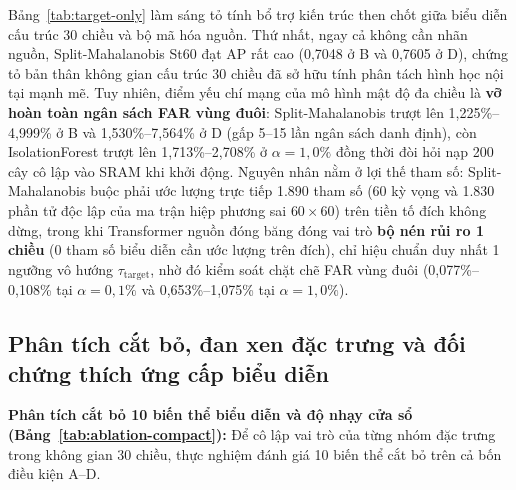 \documentclass[12pt, a4paper, reqno, oneside]{book}
\begin{document}
Bảng~\ref{tab:target-only} làm sáng tỏ tính bổ trợ kiến trúc then chốt giữa biểu diễn cấu trúc 30 chiều và bộ mã hóa nguồn. Thứ nhất, ngay cả không cần nhãn nguồn, Split-Mahalanobis St60 đạt AP rất cao (0,7048 ở B và 0,7605 ở D), chứng tỏ bản thân không gian cấu trúc 30 chiều đã sở hữu tính phân tách hình học nội tại mạnh mẽ. Tuy nhiên, điểm yếu chí mạng của mô hình mật độ đa chiều là \textbf{vỡ hoàn toàn ngân sách FAR vùng đuôi}: Split-Mahalanobis trượt lên 1,225\%--4,999\% ở B và 1,530\%--7,564\% ở D (gấp 5--15 lần ngân sách danh định), còn IsolationForest trượt lên 1,713\%--2,708\% ở $\alpha=1{,}0\%$ đồng thời đòi hỏi nạp 200 cây cô lập vào SRAM khi khởi động. Nguyên nhân nằm ở lợi thế tham số: Split-Mahalanobis buộc phải ước lượng trực tiếp 1.890 tham số (60 kỳ vọng và 1.830 phần tử độc lập của ma trận hiệp phương sai $60\times 60$) trên tiền tố đích không dừng, trong khi Transformer nguồn đóng băng đóng vai trò \textbf{bộ nén rủi ro 1 chiều} (0 tham số biểu diễn cần ước lượng trên đích), chỉ hiệu chuẩn duy nhất 1 ngưỡng vô hướng $\tau_{\text{target}}$, nhờ đó kiểm soát chặt chẽ FAR vùng đuôi (0,077\%--0,108\% tại $\alpha=0{,}1\%$ và 0,653\%--1,075\% tại $\alpha=1{,}0\%$).

\subsection{Phân tích cắt bỏ, đan xen đặc trưng và đối chứng thích ứng cấp biểu diễn}\label{subsec:eval-ablation-probe}

\textbf{Phân tích cắt bỏ 10 biến thể biểu diễn và độ nhạy cửa sổ (Bảng~\ref{tab:ablation-compact}):} Để cô lập vai trò của từng nhóm đặc trưng trong không gian 30 chiều, thực nghiệm đánh giá 10 biến thể cắt bỏ trên cả bốn điều kiện A--D.
\end{document}
